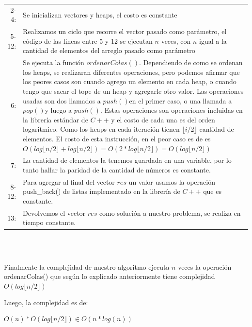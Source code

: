 \documentclass[a4paper, 10pt]{article}
\begin{document}
\begin{tabular}{rp{15.8cm}}
2-4: & Se inicializan vectores y heaps, el costo es constante\\
5-12:& Realizamos un ciclo que recorre el vector pasado como parámetro, el código de las lineas
entre 5 y 12 se ejecutan $n$ veces, con $n$ igual a la cantidad de elementos del arreglo pasado como
parámetro\\
6: & Se ejecuta la función $ordenarColas()$. Dependiendo de como se ordenan los heaps, se realizaran diferentes operaciones, pero podemos afirmar que los peores casos son cuando agrego un elemento en cada heap, o cuando tengo que sacar el tope de un heap y agregarle otro valor. Las operaciones usadas son dos llamados a $push()$\footnotemark en el primer caso, o una llamada a $pop()$\footnotemark y luego a $push()$. Estas operaciones son operaciones incluidas en la librería estándar de $C++$ y el costo de cada una es del orden logaritmico. Como los heaps en cada iteración tienen $\lfloor i/2\rfloor$ cantidad de elementos. El costo de esta instrucción, en el peor caso es de es $O(log \lfloor n/2\rfloor + log \lfloor n/2\rfloor) = O(2* log \lfloor n/2\rfloor) =
O(log \lfloor n/2\rfloor)$ \\
7: & La cantidad de elementos la tenemos guardada en una variable, por lo tanto hallar la paridad de la cantidad de números es constante.\\
8-12: & Para agregar al final del vector $res$ un valor usamos la operación push\_back() de listas implementado en la librería de $C++$ que es constante.\\
13: & Devolvemos el vector $res$ como solución a nuestro problema, se realiza en tiempo constante.\\
\end{tabular}
\\\\


Finalmente la complejidad de nuestro algoritmo ejecuta $n$ veces la operación ordenarColas() que según lo
explicado anteriormente tiene complejidad $O(log \lfloor n/2\rfloor)$

Luego, la complejidad es de:
\begin{center}
$O(n) * O(log \lfloor n/2\rfloor) \in O(n * log(n))$
\end{center}
\end{document}
